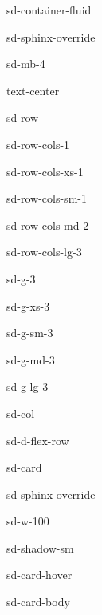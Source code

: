 \documentclass[letterpaper,10pt,english]{jupyterBook}
\begin{document}
\begin{sphinxuseclass}{sd-container-fluid}
\begin{sphinxuseclass}{sd-sphinx-override}
\begin{sphinxuseclass}{sd-mb-4}
\begin{sphinxuseclass}{text-center}
\begin{sphinxuseclass}{sd-row}
\begin{sphinxuseclass}{sd-row-cols-1}
\begin{sphinxuseclass}{sd-row-cols-xs-1}
\begin{sphinxuseclass}{sd-row-cols-sm-1}
\begin{sphinxuseclass}{sd-row-cols-md-2}
\begin{sphinxuseclass}{sd-row-cols-lg-3}
\begin{sphinxuseclass}{sd-g-3}
\begin{sphinxuseclass}{sd-g-xs-3}
\begin{sphinxuseclass}{sd-g-sm-3}
\begin{sphinxuseclass}{sd-g-md-3}
\begin{sphinxuseclass}{sd-g-lg-3}
\begin{sphinxuseclass}{sd-col}
\begin{sphinxuseclass}{sd-d-flex-row}
\begin{sphinxuseclass}{sd-card}
\begin{sphinxuseclass}{sd-sphinx-override}
\begin{sphinxuseclass}{sd-w-100}
\begin{sphinxuseclass}{sd-shadow-sm}
\begin{sphinxuseclass}{sd-card-hover}
\begin{sphinxuseclass}{sd-card-body}
\end{sphinxuseclass}{\hyperref[\detokenize{content/T_Tutorials::doc}]{}}
\end{sphinxuseclass}
\end{sphinxuseclass}
\end{sphinxuseclass}
\end{sphinxuseclass}
\end{sphinxuseclass}
\end{sphinxuseclass}
\end{sphinxuseclass}
\end{sphinxuseclass}
\end{sphinxuseclass}
\end{sphinxuseclass}
\end{sphinxuseclass}
\end{sphinxuseclass}
\end{sphinxuseclass}
\end{sphinxuseclass}
\end{sphinxuseclass}
\end{sphinxuseclass}
\end{sphinxuseclass}
\end{sphinxuseclass}
\end{sphinxuseclass}
\end{sphinxuseclass}
\end{sphinxuseclass}
\end{sphinxuseclass}
\begin{DUlineblock}{0em}
\item[] 
\end{DUlineblock}
\end{document}
